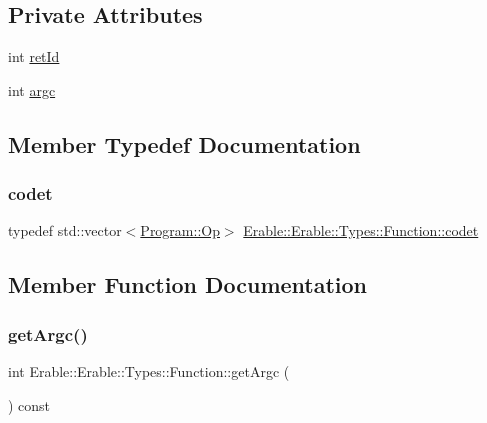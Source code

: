 \subsection*{Private Attributes}
\begin{DoxyCompactItemize}
\item 
int \mbox{\hyperlink{class_erable_1_1_erable_1_1_types_1_1_function_a60a53fd4e88e504fbae5ba2a8f19f996}{ret\+Id}}
\item 
int \mbox{\hyperlink{class_erable_1_1_erable_1_1_types_1_1_function_ad0c76efac6068e70316803834ebacd02}{argc}}
\end{DoxyCompactItemize}


\subsection{Member Typedef Documentation}
\mbox{\label{class_erable_1_1_erable_1_1_types_1_1_function_a5ae77103155252fd2e6934e506644858}} 
\subsubsection{\texorpdfstring{codet}{codet}}
{\footnotesize\ttfamily typedef std\+::vector$<$\mbox{\hyperlink{struct_erable_1_1_erable_1_1_program_1_1_op}{Program\+::\+Op}}$>$ \mbox{\hyperlink{class_erable_1_1_erable_1_1_types_1_1_function_a5ae77103155252fd2e6934e506644858}{Erable\+::\+Erable\+::\+Types\+::\+Function\+::codet}}}



\subsection{Member Function Documentation}
\mbox{\label{class_erable_1_1_erable_1_1_types_1_1_function_a5a2a46d658aafc44e70ee17f26708cec}} 
\subsubsection{\texorpdfstring{getArgc()}{getArgc()}}
{\footnotesize\ttfamily int Erable\+::\+Erable\+::\+Types\+::\+Function\+::get\+Argc (\begin{DoxyParamCaption}{ }\end{DoxyParamCaption}) const\hspace{0.3cm}{\ttfamily [inline]}}

